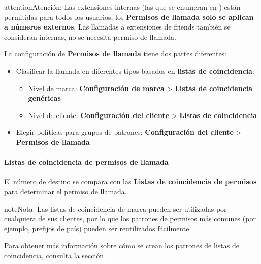 \documentclass[letterpaper,10pt,spanish]{sphinxmanual}
\begin{document}
\begin{notice}{attention}{Atención:}
Las extensiones internas (las que se enumeran en {\hyperref[administration_portal/client/vpbx/extensions:extensions]{}}) están permitidas para todos los usuarios, los \textbf{Permisos de llamada solo se aplican a números externos}. Las llamadas a extensiones de friends también se consideran internas, no se necesita permiso de llamada.
\end{notice}

La configuración de \textbf{Permisos de llamada} tiene dos partes diferentes:
\begin{itemize}
\item {} 
Clasificar la llamada en diferentes tipos basados en \textbf{listas de coincidencia}:
\begin{itemize}
\item {} 
Nivel de marca: \textbf{Configuración de marca} \textgreater{} \textbf{Listas de coincidencia genéricas}

\item {} 
Nivel de cliente: \textbf{Configuración del cliente} \textgreater{} \textbf{Listas de coincidencia}

\end{itemize}

\item {} 
Elegir políticas para grupos de patrones: \textbf{Configuración del cliente} \textgreater{} \textbf{Permisos de llamada}

\end{itemize}


\paragraph{Listas de coincidencia de permisos de llamada}
\label{administration_portal/client/vpbx/user_configuration/call_acls:call-acl-matchlists}
El número de destino se compara con las \textbf{Listas de coincidencia de permisos} para determinar el permiso de llamada.

\begin{notice}{note}{Nota:}
Las listas de coincidencia de marca pueden ser utilizadas por cualquiera de sus clientes, por lo que los patrones de permisos más comunes (por ejemplo, prefijos de país) pueden ser reutilizados fácilmente.
\end{notice}

Para obtener más información sobre cómo se crean los patrones de listas de coincidencia, consulta la sección {\hyperref[administration_portal/client/vpbx/routing_tools/match_lists:match\string-lists]{}}.
\end{document}
